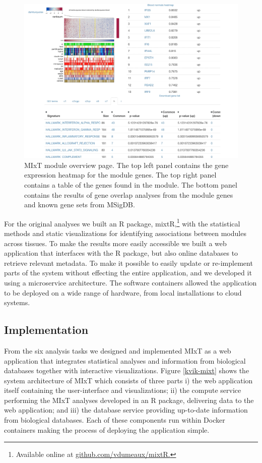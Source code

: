 \begin{figure}[h!]
\centering
\includegraphics[width=\columnwidth]{figures/module.png}
\caption{MIxT module overview page.
The top left panel
contains the gene expression heatmap for the module genes. The top right panel
contains a table of the genes found in the module. The bottom panel contains the
results of gene overlap analyses from the module genes and known gene sets from
MSigDB.}
\label{fig_first_case}
\end{figure} 

For the original analyses we built an R package, mixtR,\footnote{Available
online at \url{github.com/vdumeaux/mixtR.}} with the statistical methods and
static visualizations for identifying associations between modules across
tissues. To make the results more easily accessible we built a web application
that interfaces with the R package, but also online databases to retrieve
relevant metadata. To make it possible to easily update or re-implement parts of
the system without effecting the entire application, and we developed it using a
microservice architecture. The software containers allowed the application to be
deployed on a wide range of hardware, from local installations to cloud systems.

\subsection{Implementation} 
From the six analysis tasks we designed and implemented MIxT as a web
application that integrates statistical analyses and information from biological
databases together with interactive visualizations. Figure \ref{kvik-mixt} shows
the system architecture of MIxT which consists of three parts i) the
web application itself containing the user-interface and visualizations; ii) the
compute service performing the MIxT analyses developed in an R package,
delivering data to the web application; and iii) the database service providing
up-to-date information from biological databases.  Each of these components run
within Docker containers making the process of deploying the application simple. 

